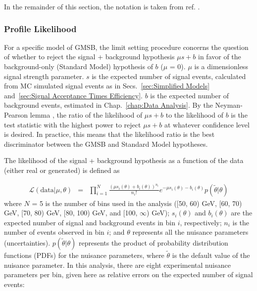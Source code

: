 \documentclass[dissertation.tex]{subfiles}
\begin{document}
In the remainder of this section, the notation is taken from ref. \cite{ATLAS:1379837}.

\subsubsection{Profile Likelihood}
\label{sec:Profile Likelihood}

For a specific model of GMSB, the limit setting procedure concerns the question of whether to reject the signal + background hypothesis $\mu s + b$ in favor of the background-only (Standard Model) hypothesis of $b$ ($\mu$ = 0).  $\mu$ is a dimensionless signal strength parameter.  $s$ is the expected number of signal events, calculated from MC simulated signal events as in Secs.~\ref{sec:Simplified Models} and~\ref{sec:Signal Acceptance Times Efficiency}.  $b$ is the expected number of background events, estimated in Chap.~\ref{chap:Data Analysis}.  By the Neyman-Pearson lemma \cite{Neyman01011933}, the ratio of the likelihood of $\mu s + b$ to the likelihood of $b$ is the test statistic with the highest power to reject $\mu s + b$ at whatever confidence level is desired.  In practice, this means that the likelihood ratio is the best discriminator between the GMSB and Standard Model hypotheses.

The likelihood of the signal + background hypothesis as a function of the data (either real or generated) is defined as 

\begin{eqnarray}
\label{eq:L_sb}
\mathcal{L}(\mbox{data} | \mu, \theta) &=& \prod_{i = 1}^{N} \frac{(\mu s_{i}(\theta) + b_{i}(\theta))^{n_{i}}}{n_{i}!}e^{-\mu s_{i}(\theta) - b_{i}(\theta)}p(\tilde{\theta} | \theta)
\end{eqnarray}
%
where $N$ = 5 is the number of \MET bins used in the analysis ([50, 60) GeV, [60, 70) GeV, [70, 80) GeV, [80, 100) GeV, and [100, $\infty$) GeV); $s_{i}(\theta)$ and $b_{i}(\theta)$ are the expected number of signal and background events in \MET bin $i$, respectively; $n_{i}$ is the number of events observed in \MET bin $i$; and $\theta$ represents all the nuisance parameters (uncertainties).  $p(\tilde{\theta} | \theta)$ represents the product of probability distribution functions (PDFs) for the nuisance parameters, where $\tilde{\theta}$ is the default value of the nuisance parameter.  In this analysis, there are eight experimental nuisance parameters per \MET bin, given here as relative errors on the expected number of signal events:
\end{document}
